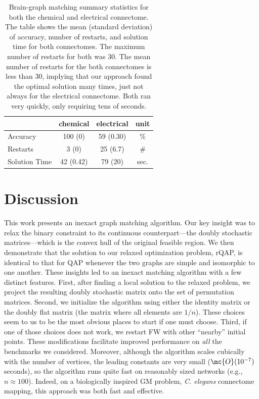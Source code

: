 \documentclass[10pt,journal,cspaper,compsoc]{IEEEtran}
\begin{document}
\begin{table}
\caption{Brain-graph matching summary statistics for both the chemical and electrical connectome.  
The table shows the mean (standard deviation) of accuracy, number of restarts, and solution time for both connectomes.  
The maximum number of restarts for both was 30.  The mean number of restarts for the both connectomes is less than 30, implying that our approach found the optimal solution many times, just not always for the electrical connectome.  Both ran very quickly, only requiring tens of seconds.}
	\label{tab:1}
\begin{center}
\begin{tabular}{|l|c|c|c|}
	\hline  	& chemical 	& electrical 	& unit \\ \hline
	Accuracy  		  	& 100  (0)  & 59 (0.30) 	& \% \\
	Restarts 	  		& 3    (0)  & 25 (6.7)  	& \# \\
	Solution Time  		& 42 (0.42)	& 79 (20)  		& sec. \\ \hline
\end{tabular} 
\end{center}
\end{table}

 


\section{Discussion}

This work presents an inexact graph matching algorithm.  Our key insight was to relax the binary constraint to its continuous counterpart---the doubly stochastic matrices---which is the convex hull of the original feasible region.  We then demonstrate that the solution to our relaxed optimization problem, rQAP, is identical to that for QAP whenever the two graphs are simple and isomorphic to one another. These insights led to an inexact matching algorithm with a few distinct features. %
First, after finding a local solution to the relaxed problem, we project the resulting doubly stochastic matrix onto the set of permutation matrices.  Second, we initialize the algorithm using either the identity matrix or the doubly flat matrix (the matrix where all elements are $1/n$).  These choices seem to us to be the most obvious places to start if one must choose.  Third, if one of those choices does not work, we restart FW with other ``nearby'' initial points.  These modifications facilitate improved performance on \emph{all} the benchmarks we considered.  Moreover, although the algorithm scales cubically with the number of vertices, the leading constants are very small ($\mc{O}(10^{-7})$ seconds), so the algorithm runs quite fast on reasonably sized networks (e.g., $n \approx 100$).  Indeed, on a biologically inspired GM problem, \emph{C. elegans} connectome mapping, this approach was both fast and effective.  
\end{document}
